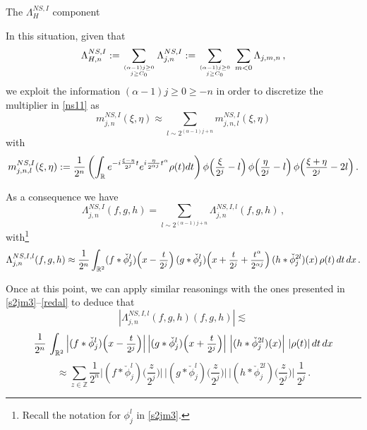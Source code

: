 \documentclass[a4paper,reqno]{amsart}
\makeatletter
\def\subsubsection{\@startsection{subsubsection}{3}%
	\z@{.5\linespacing\@plus.7\linespacing}{-.5em}%
	{\normalfont\bfseries\boldmath}}
\numberwithin{equation}{section}
\theoremstyle{definition}
\newcommand{\R}{\mathbb{R}}
\newcommand{\Z}{\mathbb{Z}}
\newcommand{\sdfrac}[2]{\mbox{\small$\displaystyle\frac{#1}{#2}$}}
\def\a{\alpha}
\def\L{\Lambda}
\makeatother
\begin{document}
\subsubsection{The $\L^{NS,I}_{H}$ component}\label{lns1h}

In this situation, given that
\begin{align}\label{ns10L}
\L^{NS,I}_{H,n}:=\sum_{{(\a-1)j\geq 0}\atop{j\geq C_0}} \L^{NS,I}_{j,n}:=\sum_{{(\a-1)j\geq 0}\atop{j\geq C_0}}\:\sum_{m<0} \L_{j,m,n}\,,
\end{align}
we exploit the information  $(\a-1)j\geq 0\geq-n$ in order to discretize the multiplier in \eqref{ns11} as
\begin{equation}\label{saljmm0nl1}
		m_{j,n}^{NS,I}(\xi,\eta)\approx\sum_{l\sim 2^{(\a-1)j+n}} m_{j,n,l}^{NS,I}(\xi,\eta)
\end{equation}
with
\begin{equation}\label{saljmm1nl}
		m_{j,n,l}^{NS,I}(\xi,\eta):=\frac{1}{2^n}\left(\int_\R e^{-i\frac{\xi-\eta}{2^j}  t}e^{i\frac{\eta}{2^{\a j}}t^\a}\rho(t)dt\right)
		\phi\Big(\sdfrac{\xi}{2^{j}}-l\Big)\,\phi\Big(\sdfrac{\eta}{2^{j}}-l\Big)\,\phi\Big(\sdfrac{\xi+\eta}{2^{j}}-2l\Big)\,.
\end{equation}

As a consequence we have
\begin{equation}\label{saljmsumnl}
\L^{NS,I}_{j,n}(f,g,h)=\sum_{l\sim 2^{(\a-1)j+n}}\L^{NS,I,l}_{j,n}(f,g,h)\,,
\end{equation}
with\footnote{Recall the notation for $\phi_{j}^l$ in \eqref{s2jm3}.}
\begin{equation}\label{saljm2nl}
	\L^{NS,I,l}_{j,n}(f,g,h)\approx\frac{1}{2^n}\int_{\R^2}  (f*\check{\phi}_{j}^l)\Big(x-\sdfrac{t}{2^j}\Big)\,(g*\check{\phi}_{j}^l)\Big(x+\sdfrac{t}{2^j}+\sdfrac{t^\a}{2^{\a j}}\Big)\,(h*\check{\phi}_{j}^{2l})(x)\,\rho(t)\,dt\,dx\,.
\end{equation}

Once at this point, we can apply similar reasonings with the ones presented in \eqref{s2jm3}--\eqref{redal} to deduce that
\begin{equation}\label{saljm20nl}
	|\L^{NS,I,l}_{j,n}(f,g,h)(f,g,h)|\lesssim
\end{equation}
$$\frac{1}{2^n}\,\int_{\R^2}  \Big|(f*\check{\phi}_{j}^l)\Big(x-\sdfrac{t}{2^j}\Big)\Big|\,\Big|(g*\check{\phi}_{j}^l)\Big(x+\sdfrac{t}{2^j}\Big)\Big|\,
\left|(h*\check{\phi}_{j}^{2l})(x)\right|\,|\rho(t)|\,dt\,dx$$
$$\approx \sum_{z\in\Z}\frac{1}{2^n} \Big|(f*\check{\phi}_{j}^l)\Big(\frac{z}{2^{j}}\Big)\Big|\,\Big|(g*\check{\phi}_{j}^l)\Big(\frac{z}{2^{j}}\Big)\Big|\,
\Big|(h*\check{\phi}_{j}^{2l})\Big(\frac{z}{2^{j}}\Big)\Big|\,\frac{1}{2^{j}}\,.$$
\end{document}
